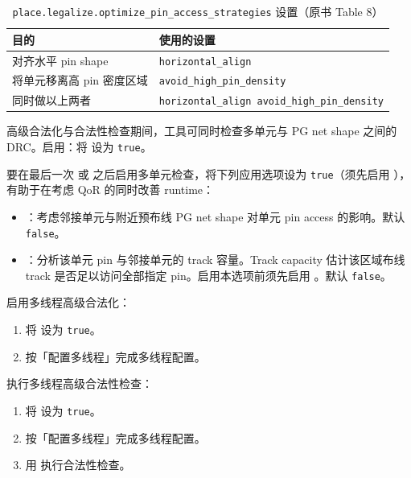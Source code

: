\begin{table}[htbp]
\centering
\caption{\texttt{place.legalize.optimize\_pin\_access\_strategies} 设置（原书 Table 8）}
\label{tab:ch2b-pin-access-strategies}
\begin{tabularx}{\textwidth}{@{}X l@{}}
\toprule
\textbf{目的} & \textbf{使用的设置} \\
\midrule
对齐水平 pin shape & \texttt{horizontal\_align} \\
将单元移离高 pin 密度区域 & \texttt{avoid\_high\_pin\_density} \\
同时做以上两者 & \texttt{horizontal\_align avoid\_high\_pin\_density} \\
\bottomrule
\end{tabularx}
\end{table}

高级合法化与合法性检查期间，工具可同时检查多单元与 PG net shape 之间的 DRC。启用：将  设为 \texttt{true}。

要在最后一次  或  之后启用多单元检查，将下列应用选项设为 \texttt{true}（须先启用 ），有助于在考虑 QoR 的同时改善 runtime：
\begin{itemize}
  \item {}：考虑邻接单元与附近预布线 PG net shape 对单元 pin access 的影响。默认 \texttt{false}。
  \item {}：分析该单元 pin 与邻接单元的 track 容量。Track capacity 估计该区域布线 track 是否足以访问全部指定 pin。启用本选项前须先启用 。默认 \texttt{false}。
\end{itemize}

启用多线程高级合法化：
\begin{enumerate}
  \item 将  设为 \texttt{true}。
  \item 按「配置多线程」完成多线程配置。
\end{enumerate}

执行多线程高级合法性检查：
\begin{enumerate}
  \item 将  设为 \texttt{true}。
  \item 按「配置多线程」完成多线程配置。
  \item 用  执行合法性检查。
\end{enumerate}

